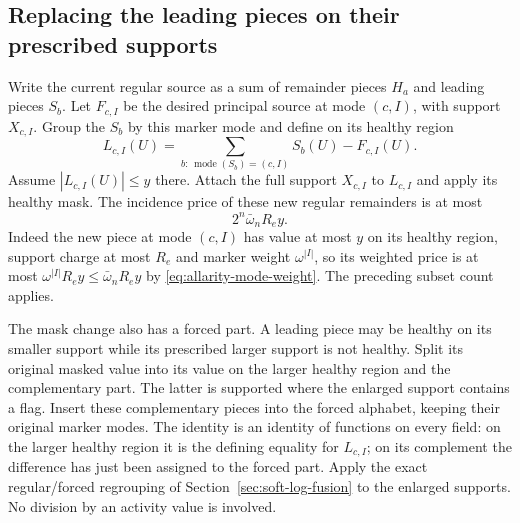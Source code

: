 \subsection{Replacing the leading pieces on their prescribed supports}

Write the current regular source as a sum of remainder pieces $H_a$
and leading pieces $S_b$. Let $F_{c,I}$ be the desired principal source
at mode $(c,I)$, with support $X_{c,I}$. Group the $S_b$ by this marker
mode and define on its healthy region
\[
 L_{c,I}(U)=\sum_{b:\,\operatorname{mode}(S_b)=(c,I)}S_b(U)
                        -F_{c,I}(U).
\]
Assume $|L_{c,I}(U)|\le y$ there. Attach the full support $X_{c,I}$
to $L_{c,I}$ and apply its healthy mask. The incidence price of these
new regular remainders is at most
\begin{equation}\label{eq:allarity-realign-regular}
                         2^n \bar\omega_n R_e y.
\end{equation}
Indeed the new piece at mode $(c,I)$ has value at most $y$ on its
healthy region, support charge at most $R_e$ and marker weight
$\omega^{|I|}$, so its weighted price is at most
$\omega^{|I|}R_ey\le\bar\omega_nR_ey$ by
\eqref{eq:allarity-mode-weight}. The preceding subset count applies.

The mask change also has a forced part. A leading piece may be healthy
on its smaller support while its prescribed larger support is not
healthy. Split its original masked value into its value on the larger
healthy region and the complementary part. The latter is supported
where the enlarged support contains a flag. Insert these complementary
pieces into the forced alphabet, keeping their original marker modes.
The identity is an identity of functions on every field: on the larger
healthy region it is the defining equality for $L_{c,I}$; on its
complement the difference has just been assigned to the forced part.
Apply the exact regular/forced regrouping of
Section~\ref{sec:soft-log-fusion} to the enlarged supports. No division
by an activity value is involved.

